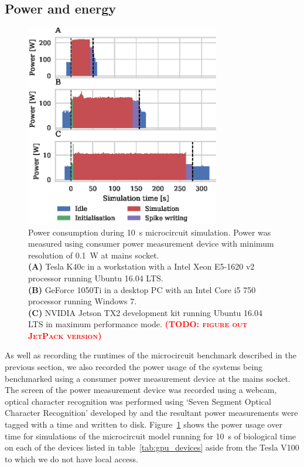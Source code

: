 \documentclass[utf8]{frontiersSCNS} %
\newcommand{\todo}[1]{\textbf{\textsc{\textcolor{red}{(TODO: #1)}}}}
\begin{document}
\subsection{Power and energy}
\begin{figure}
    \begin{center}
        \includegraphics[width=85mm]{figures/microcircuit_power}
    \end{center}
    \caption{Power consumption during \SI{10}{\second} microcircuit simulation.
    Power was measured using consumer power measurement device with minimum resolution of \SI{0.1}{\watt} at mains socket.\\
    \textbf{(A)} Tesla K40c in a workstation with a Intel Xeon E5-1620 v2 processor running Ubuntu 16.04 LTS.\\
    \textbf{(B)} GeForce 1050Ti in a desktop PC with an Intel Core i5 750 processor running Windows 7.\\
    \textbf{(C)} NVIDIA Jetson TX2 development kit running Ubuntu 16.04 LTS in maximum performance mode. \todo{figure out JetPack version}}
    \label{fig:microcircuit_power}
\end{figure}

As well as recording the runtimes of the microcircuit benchmark described in the previous section, we also recorded the power usage of the systems being benchmarked using a consumer power measurement device at the mains socket.
The screen of the power measurement device was recorded using a webcam, optical character recognition was performed using `Seven Segment Optical Character Recognition' developed by \citet{Auerswald2018} and the resultant power measurements were tagged with a time and written to disk.
Figure~\ref{fig:microcircuit_power} shows the power usage over time for simulations of the microcircuit model running for \SI{10}{\second} of biological time on each of the devices listed in table~\ref{tab:gpu_devices} aside from the Tesla V100 to which we do not have local access.
\end{document}
